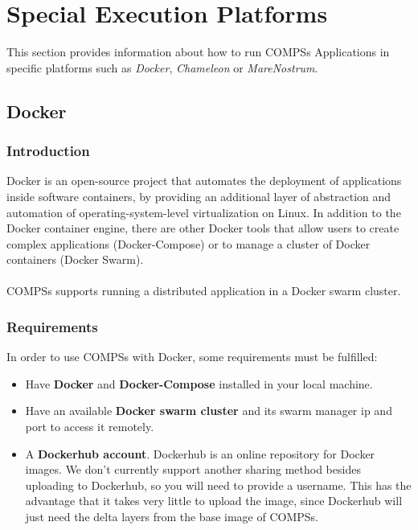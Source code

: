 \section{Special Execution Platforms}
\label{sec:Execution_Platfors}

This section provides information about how to run COMPSs Applications in specific platforms such as \textit{Docker},
\textit{Chameleon} or \textit{MareNostrum}.


\subsection{Docker}

\subsubsection{Introduction}
Docker is an open-source project that automates the deployment of applications inside software containers, 
by providing an additional layer of abstraction and automation of operating-system-level virtualization on Linux.
In addition to the Docker container engine, there are other Docker tools that allow users to create complex applications (Docker-Compose) 
or to manage a cluster of Docker containers (Docker Swarm).
\\ \\ 
COMPSs supports running a distributed application in a Docker swarm cluster.
\\

\subsubsection{Requirements}
In order to use COMPSs with Docker, some requirements must be fulfilled:
\begin{itemize}  
\item Have \textbf{Docker} and \textbf{Docker-Compose} installed in your local machine.
\item Have an available \textbf{Docker swarm cluster} and its swarm manager ip and port to access it remotely.
\item A \textbf{Dockerhub account}. Dockerhub is an online repository for Docker images. We don't currently support
      another sharing method besides uploading to Dockerhub, so you will need to provide a username.
      This has the advantage that it takes very little to upload the image, since Dockerhub 
      will just need the delta layers from the base image of COMPSs.
\end{itemize}

